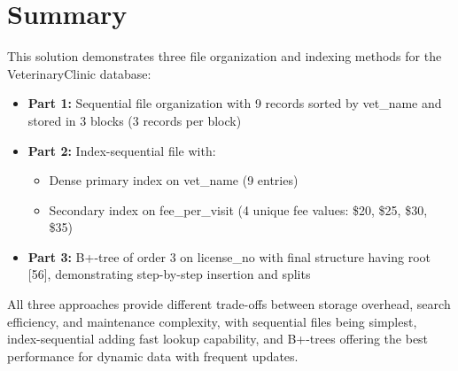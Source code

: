 \documentclass[12pt]{article}
\begin{document}
\newpage
\section{Summary}

This solution demonstrates three file organization and indexing methods for the VeterinaryClinic database:

\begin{itemize}
    \item \textbf{Part 1:} Sequential file organization with 9 records sorted by vet\_name and stored in 3 blocks (3 records per block)
    
    \item \textbf{Part 2:} Index-sequential file with:
    \begin{itemize}
        \item Dense primary index on vet\_name (9 entries)
        \item Secondary index on fee\_per\_visit (4 unique fee values: \$20, \$25, \$30, \$35)
    \end{itemize}
    
    \item \textbf{Part 3:} B+-tree of order 3 on license\_no with final structure having root [56], demonstrating step-by-step insertion and splits
\end{itemize}

\vspace{0.5cm}

All three approaches provide different trade-offs between storage overhead, search efficiency, and maintenance complexity, with sequential files being simplest, index-sequential adding fast lookup capability, and B+-trees offering the best performance for dynamic data with frequent updates.
\end{document}
